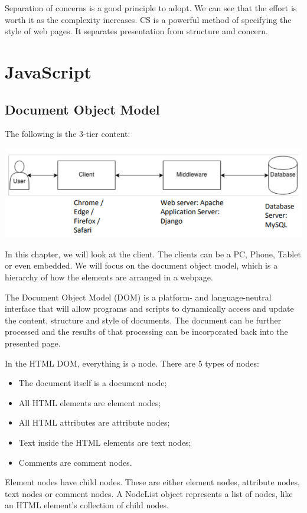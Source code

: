 \documentclass[a4paper, openany]{memoir}
\begin{document}
Separation of concerns is a good principle to adopt. We can see that the effort is worth it as the complexity increases. CS is a powerful method of specifying the style of web pages. It separates presentation from structure and concern.
\newpage

\section{JavaScript}
\subsection{Document Object Model}
The following is the 3-tier content:
\begin{center}
    \includegraphics[scale=0.7]{src/L12I1.PNG}
\end{center}
In this chapter, we will look at the client. The clients can be a PC, Phone, Tablet or even embedded. We will focus on the document object model, which is a hierarchy of how the elements are arranged in a webpage.

The Document Object Model (DOM) is a platform- and language-neutral interface that will allow programs and scripts to dynamically access and update the content, structure and style of documents. The document can be further processed and the results of that processing can be incorporated back into the presented page.

In the HTML DOM, everything is a node. There are 5 types of nodes:
\begin{itemize}
    \item The document itself is a document node;
    \item All HTML elements are element nodes;
    \item All HTML attributes are attribute nodes;
    \item Text inside the HTML elements are text nodes;
    \item Comments are comment nodes.
\end{itemize}
Element nodes have child nodes. These are either element nodes, attribute nodes, text nodes or comment nodes. A NodeList object represents a list of nodes, like an HTML element's collection of child nodes.
\end{document}
